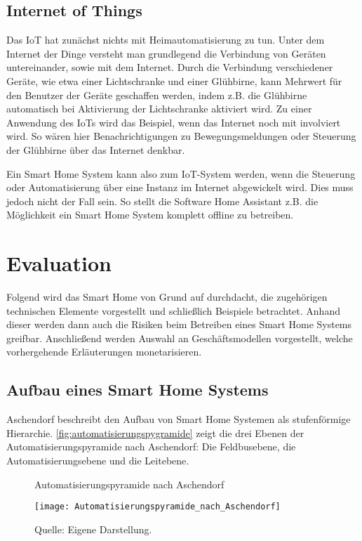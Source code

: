 \subsection{Internet of Things}

Das \ac{IoT} hat zunächst nichts mit Heimautomatisierung zu tun.
Unter dem Internet der Dinge versteht man grundlegend die Verbindung von Geräten untereinander, sowie mit dem Internet.
Durch die Verbindung verschiedener Geräte, wie etwa einer Lichtschranke und einer Glühbirne, kann Mehrwert für den Benutzer der Geräte geschaffen werden, indem z.B. die Glühbirne automatisch bei Aktivierung der Lichtschranke aktiviert wird.
Zu einer Anwendung des \acp{IoT} wird das Beispiel, wenn das Internet noch mit involviert wird.
So wären hier Benachrichtigungen zu Bewegungsmeldungen oder Steuerung der Glühbirne über das Internet denkbar.

Ein Smart Home System kann also zum \ac{IoT}-System werden, wenn die Steuerung oder Automatisierung über eine Instanz im Internet abgewickelt wird.
Dies muss jedoch nicht der Fall sein.
So stellt die Software Home Assistant z.B. die Möglichkeit ein Smart Home System komplett offline zu betreiben.

\section{Evaluation}

Folgend wird das Smart Home von Grund auf durchdacht, die zugehörigen technischen Elemente vorgestellt und schließlich Beispiele betrachtet.
Anhand dieser werden dann auch die Risiken beim Betreiben eines Smart Home Systems greifbar.
Anschließend werden Auswahl an Geschäftsmodellen vorgestellt, welche vorhergehende Erläuterungen monetarisieren.

\subsection{Aufbau eines Smart Home Systems}\label{sec:aufbau}

Aschendorf beschreibt den Aufbau von Smart Home Systemen als stufenförmige Hierarchie.
\autoref{fig:automatisierungspygramide} zeigt die drei Ebenen der Automatisierungspyramide nach Aschendorf:
Die Feldbusebene, die Automatisierungsebene und die Leitebene. 

\begin{figure}[ht]
	\centering
	\caption{Automatisierungspyramide nach Aschendorf}
	\texttt{[image: Automatisierungspyramide\_nach\_Aschendorf]}
	\caption*{\footnotesize{Quelle: Eigene Darstellung.}}
	\label{fig:automatisierungspygramide}
\end{figure}

